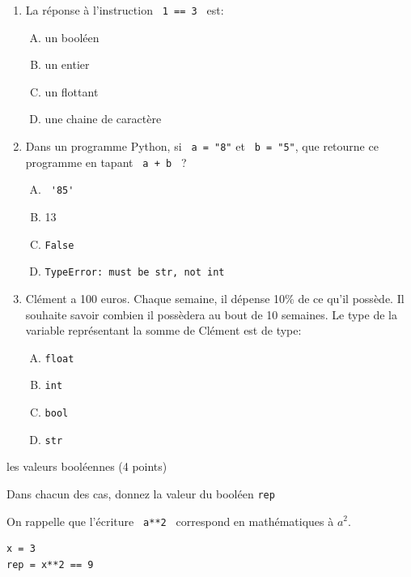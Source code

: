 \documentclass[a4paper,12pt,openany]{book}
\begin{document}
\begin{enumerate}
	\item La réponse à l'instruction \verb+ 1 == 3 + est:
	\begin{enumerate}[A.]
		\item un booléen
		\item un entier
		\item un flottant
		\item une chaine de caractère
	\end{enumerate}		
	
	\medskip
	
	\item Dans un programme Python, si \verb+ a = "8"+ et \verb+ b = "5"+, que retourne ce programme en tapant \verb- a + b - ?
	\begin{enumerate}[A.]
		\item \verb+ '85'+
		\item 13
		\item \verb+False+
		\item \verb+TypeError: must be str, not int+
	\end{enumerate}
	
	\medskip
	
	\item Clément a 100 euros. Chaque semaine, il dépense 10\% de ce qu'il possède. Il souhaite savoir combien il possèdera au bout de 10 semaines. Le type de la variable représentant la somme de Clément est de type:
	
	\begin{enumerate}[A.]
		\item \verb+float+
		\item \verb+int+
		\item \verb+bool+
		\item \verb+str+
	\end{enumerate}
\end{enumerate}

\bigskip

\exo \qquad les valeurs booléennes\hfill
(4 points)

Dans chacun des cas, donnez la valeur du booléen \verb+rep+

On rappelle que l'écriture \verb+ a**2 + correspond en mathématiques à $a^2$.

	
	\begin{lstlisting}
x = 3
rep = x**2 == 9
\end{lstlisting}

\bigskip
\end{document}
